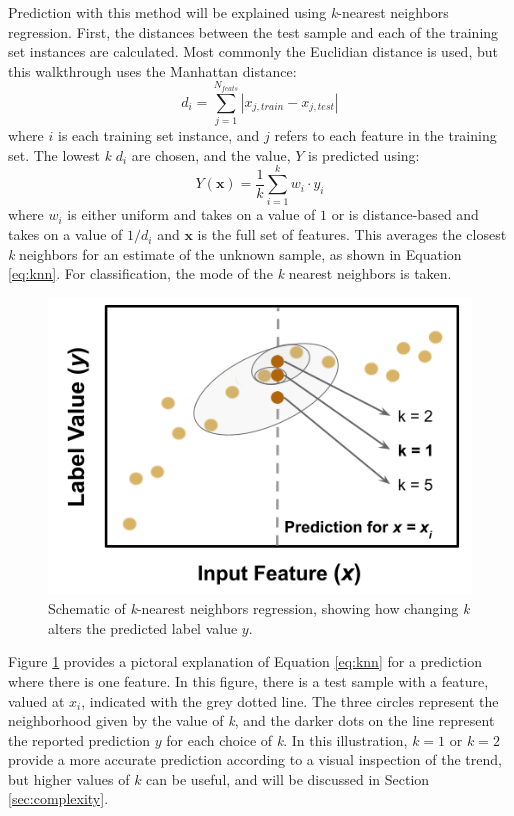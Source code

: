 Prediction with this method will be explained using \textit{k}-nearest
neighbors regression.  First, the distances between the test sample and each of
the training set instances are calculated.  Most commonly the Euclidian
distance is used, but this walkthrough uses the Manhattan distance:
\begin{equation}
  d_{i} = \sum_{j=1}^{N_{feats}} |x_{j,train} - x_{j,test}|
  \label{eq:l1}
\end{equation}
where $i$ is each training set instance, and $j$ refers to each feature in the
training set.  The lowest \textit{k} $d_{i}$ are chosen, and the value, $Y$ is
predicted using:
\begin{equation}
  Y(\boldsymbol{x}) = \frac{1}{k} \sum_{i=1}^{k} w_i \cdot y_i
  \label{eq:knn}
\end{equation}
where $w_{i}$ is either uniform and takes on a value of $1$ or is
distance-based and takes on a value of $1/d_{i}$ and $\boldsymbol{x}$ is the
full set of features.  This averages the closest \textit{k} neighbors for an
estimate of the unknown sample, as shown in Equation \ref{eq:knn}.  For
classification, the mode of the \textit{k} nearest neighbors is taken.  

\begin{figure}[!htb]
  \centering
  \includegraphics[width=0.8\linewidth]{./chapters/litrev/nn-fig.png}
  \caption{Schematic of \textit{k}-nearest neighbors regression, showing how 
           changing \textit{k} alters the predicted label value $y$.}
  \label{fig:nn}
\end{figure}

Figure \ref{fig:nn} provides a pictoral explanation of Equation \ref{eq:knn}
for a prediction where there is one feature. In this figure, there is a test
sample with a feature, valued at $x_i$, indicated with the grey dotted line.
The three circles represent the neighborhood given by the value of \textit{k},
and the darker dots on the line represent the reported prediction $y$ for each
choice of \textit{k}.  In this illustration, $k=1$ or $k=2$ provide a more
accurate prediction according to a visual inspection of the trend, but higher
values of $k$ can be useful, and will be discussed in Section
\ref{sec:complexity}.

